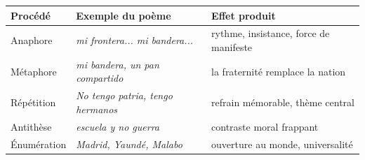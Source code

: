 \documentclass[11pt]{article}
\newcommand{\esp}[1]{\ifmmode\text{\textit{#1}}\else\begingroup\selectlanguage{spanish}\itshape #1\endgroup\fi}
\begin{document}
\begin{center}
\begin{tabularx}{\linewidth}{|X|X|X|}
\hline
\rowcolor{popblueL} \textbf{Procédé} & \textbf{Exemple du poème} & \textbf{Effet produit} \\
\hline
Anaphore & \esp{mi frontera... mi bandera...} & rythme, insistance, force de manifeste \\
\hline
Métaphore & \esp{mi bandera, un pan compartido} & la fraternité remplace la nation \\
\hline
Répétition & \esp{No tengo patria, tengo hermanos} & refrain mémorable, thème central \\
\hline
Antithèse & \esp{escuela y no guerra} & contraste moral frappant \\
\hline
Énumération & \esp{Madrid, Yaundé, Malabo} & ouverture au monde, universalité \\
\hline
\end{tabularx}
\end{center}
\end{document}
